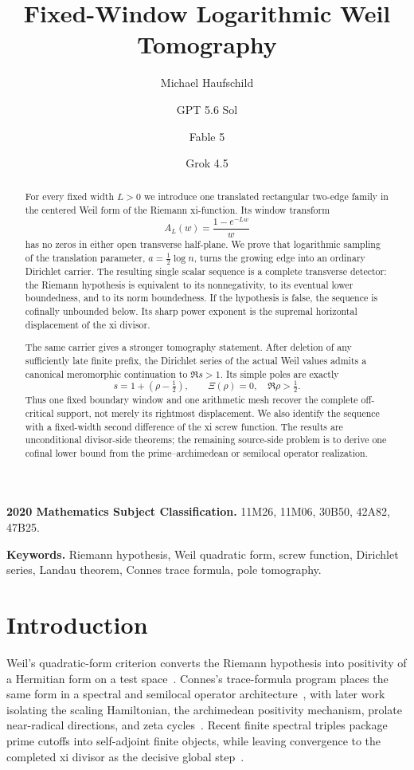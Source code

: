 \documentclass[11pt]{article}
\title{Fixed-Window Logarithmic Weil Tomography}
\author{Michael Haufschild \and GPT 5.6 Sol \and Fable 5 \and Grok 4.5}
\date{}
\newcommand{\XiR}{\Xi}
\begin{document}
\maketitle

\begin{abstract}
For every fixed width $L>0$ we introduce one translated rectangular two-edge family in the
centered Weil form of the Riemann xi-function.  Its window transform
\[
 A_L(w)=\frac{1-e^{-Lw}}{w}
\]
has no zeros in either open transverse half-plane.  We prove that logarithmic sampling of the
translation parameter, $a=\frac12\log n$, turns the growing edge into an ordinary Dirichlet
carrier.  The resulting single scalar sequence is a complete transverse detector: the Riemann
hypothesis is equivalent to its nonnegativity, to its eventual lower boundedness, and to its norm
boundedness.  If the hypothesis is false, the sequence is cofinally unbounded below.  Its sharp
power exponent is the supremal horizontal displacement of the xi divisor.

The same carrier gives a stronger tomography statement.  After deletion of any sufficiently late
finite prefix, the Dirichlet series of the actual Weil values admits a canonical meromorphic
continuation to $\Re s>1$.  Its simple poles are exactly
\[
  s=1+(\rho-\tfrac12),\qquad \XiR(\rho)=0,\quad \Re\rho>\tfrac12.
\]
Thus one fixed boundary window and one arithmetic mesh recover the complete off-critical support,
not merely its rightmost displacement.  We also identify the sequence with a fixed-width second
difference of the xi screw function.  The results are unconditional divisor-side theorems; the
remaining source-side problem is to derive one cofinal lower bound from the prime--archimedean or
semilocal operator realization.
\end{abstract}

\noindent\textbf{2020 Mathematics Subject Classification.}
11M26, 11M06, 30B50, 42A82, 47B25.

\noindent\textbf{Keywords.}
Riemann hypothesis, Weil quadratic form, screw function, Dirichlet series, Landau theorem,
Connes trace formula, pole tomography.

\section{Introduction}

Weil's quadratic-form criterion converts the Riemann hypothesis into positivity of a Hermitian
form on a test space~\cite{Weil1952,Yoshida1992,Bombieri2000}.  Connes's trace-formula program
places the same form in a spectral and semilocal operator architecture~\cite{Connes1999}, with
later work isolating the scaling Hamiltonian, the archimedean positivity mechanism, prolate
near-radical directions, and zeta cycles~\cite{ConnesConsani2019,ConnesConsani2021,
ConnesConsani2023}.  Recent finite spectral triples package prime cutoffs into self-adjoint
finite objects, while leaving convergence to the completed xi divisor as the decisive global
step~\cite{ConnesConsaniMoscovici2025}.
\end{document}
